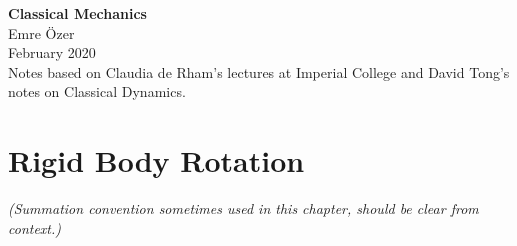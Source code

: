 \documentclass{article}
\begin{document}
	\begin{titlepage}
		\vspace*{\fill}
		\begin{center}
			{\Huge{\textbf{Classical Mechanics}}}\\[2cm]
			{\large{Emre Özer}\\[0.1cm]}
			February 2020 \\
			\vspace{4mm}
			Notes based on Claudia de Rham's lectures at Imperial College and David Tong's notes on Classical Dynamics.
		\end{center}
		\vspace*{\fill}
	\end{titlepage}
	
	\tableofcontents
	\newpage

\section{Rigid Body Rotation}
\textit{(Summation convention sometimes used in this chapter, should be clear from context.)}
\end{document}
